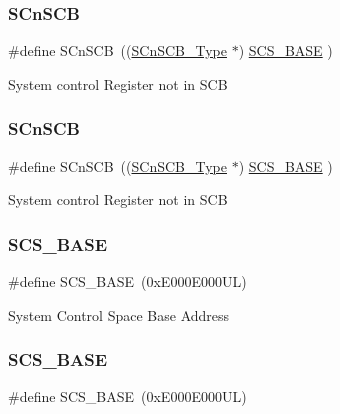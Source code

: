 \subsubsection{\texorpdfstring{SCnSCB}{SCnSCB}\hspace{0.1cm}{\footnotesize\ttfamily [3/4]}}
{\footnotesize\ttfamily \#define S\+Cn\+S\+CB~((\mbox{\hyperlink{struct_s_cn_s_c_b___type}{S\+Cn\+S\+C\+B\+\_\+\+Type}}    $\ast$)     \mbox{\hyperlink{group___c_m_s_i_s__core__base_ga3c14ed93192c8d9143322bbf77ebf770}{S\+C\+S\+\_\+\+B\+A\+SE}}      )}

System control Register not in S\+CB \mbox{\label{group___c_m_s_i_s__core__base_ga9fe0cd2eef83a8adad94490d9ecca63f}} 
\subsubsection{\texorpdfstring{SCnSCB}{SCnSCB}\hspace{0.1cm}{\footnotesize\ttfamily [4/4]}}
{\footnotesize\ttfamily \#define S\+Cn\+S\+CB~((\mbox{\hyperlink{struct_s_cn_s_c_b___type}{S\+Cn\+S\+C\+B\+\_\+\+Type}}    $\ast$)     \mbox{\hyperlink{group___c_m_s_i_s__core__base_ga3c14ed93192c8d9143322bbf77ebf770}{S\+C\+S\+\_\+\+B\+A\+SE}}      )}

System control Register not in S\+CB \mbox{\label{group___c_m_s_i_s__core__base_ga3c14ed93192c8d9143322bbf77ebf770}} 
\subsubsection{\texorpdfstring{SCS\_BASE}{SCS\_BASE}\hspace{0.1cm}{\footnotesize\ttfamily [1/6]}}
{\footnotesize\ttfamily \#define S\+C\+S\+\_\+\+B\+A\+SE~(0x\+E000\+E000\+U\+L)}

System Control Space Base Address \mbox{\label{group___c_m_s_i_s__core__base_ga3c14ed93192c8d9143322bbf77ebf770}} 
\subsubsection{\texorpdfstring{SCS\_BASE}{SCS\_BASE}\hspace{0.1cm}{\footnotesize\ttfamily [2/6]}}
{\footnotesize\ttfamily \#define S\+C\+S\+\_\+\+B\+A\+SE~(0x\+E000\+E000\+U\+L)}

